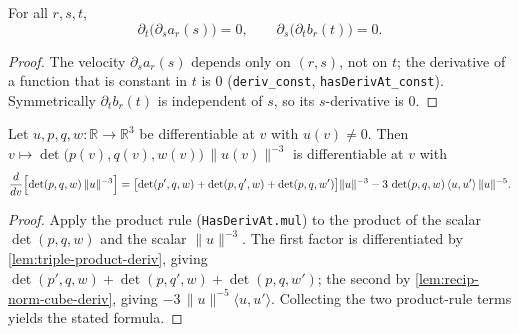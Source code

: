 \begin{lemma}
    \label{lem:cross-mixed-partials-vanish}
    \leanok
    For all $r,s,t$,
    \[
        \partial_t\bigl(\partial_s a_r(s)\bigr)=0,\qquad
        \partial_s\bigl(\partial_t b_r(t)\bigr)=0.
    \]
\end{lemma}
\begin{proof}
    The velocity $\partial_s a_r(s)$ depends only on $(r,s)$, not on $t$; the
    derivative of a function that is constant in $t$ is $0$ (\texttt{deriv\_const},
    \texttt{hasDerivAt\_const}). Symmetrically $\partial_t b_r(t)$ is independent of
    $s$, so its $s$-derivative is $0$.
\end{proof}

\begin{lemma}
    \label{lem:det-norm-quotient-deriv}
    Let $u,p,q,w:\mathbb{R}\to\mathbb{R}^3$ be differentiable at $v$ with
    $u(v)\neq0$. Then $v\mapsto\det\bigl(p(v),q(v),w(v)\bigr)\,\lVert u(v)\rVert^{-3}$
    is differentiable at $v$ with
    \[
        \frac{d}{dv}\Bigl[\det(p,q,w)\,\lVert u\rVert^{-3}\Bigr]
        =\bigl[\det(p',q,w)+\det(p,q',w)+\det(p,q,w')\bigr]\lVert u\rVert^{-3}
         -3\,\det(p,q,w)\,\langle u,u'\rangle\,\lVert u\rVert^{-5}.
    \]
\end{lemma}
\begin{proof}
    Apply the product rule (\texttt{HasDerivAt.mul}) to the product of the scalar
    $\det(p,q,w)$ and the scalar $\lVert u\rVert^{-3}$. The first factor is
    differentiated by \cref{lem:triple-product-deriv}, giving
    $\det(p',q,w)+\det(p,q',w)+\det(p,q,w')$; the second by
    \cref{lem:recip-norm-cube-deriv}, giving
    $-3\,\lVert u\rVert^{-5}\langle u,u'\rangle$. Collecting the two product-rule
    terms yields the stated formula.
\end{proof}


